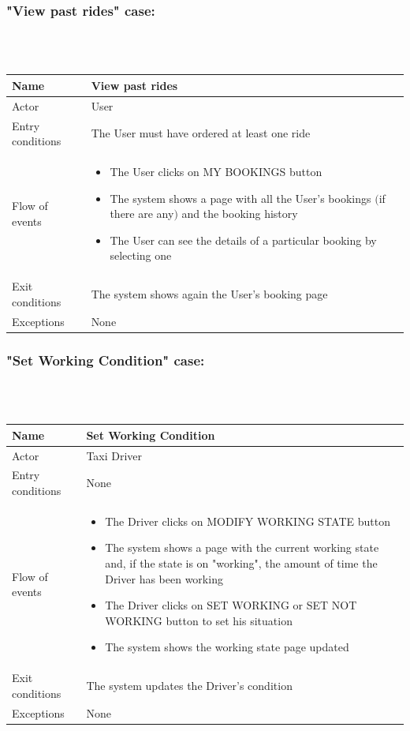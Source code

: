 \newpage
\subsubsection{"View past rides" case:}
\hfill \\
\\
\begin{tabular}{|p{3cm}|p{10cm}|}
\hline
Name & View past rides\\
\hline
Actor & User\\
\hline
Entry conditions & The User must have ordered at least one ride\\
\hline
Flow of events &
	\begin{itemize}
		\item The User clicks on MY BOOKINGS button
		\item The system shows a page with all the User's bookings $($if there are any$)$ and the booking history
		\item The User can see the details of a particular booking by selecting one
	\end{itemize}\\

\hline
Exit conditions & The system shows again the User's booking page\\
\hline
Exceptions & None\\
\hline
\end {tabular}

\newpage
\subsubsection{"Set Working Condition" case:}
\hfill \\
\\
\begin {tabular}{|p{3cm}|p{10cm}|}
\hline
Name & Set Working Condition\\
\hline
Actor & Taxi Driver\\
\hline
Entry conditions & None\\
\hline
Flow of events &
	\begin {itemize}
		\item The Driver clicks on MODIFY WORKING STATE button
		\item The system shows a page with the current working state and, if the state is on "working", the amount of time the Driver has been working
		\item The Driver clicks on SET WORKING or SET NOT WORKING button to set his situation
		\item The system shows the working state page updated
	\end {itemize}\\

\hline
Exit conditions & The system updates the Driver's condition\\
\hline
Exceptions & None\\
\hline
\end {tabular}


